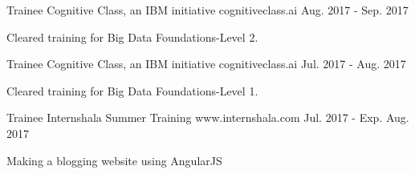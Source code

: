 


\begin{cventries}


\cventry
{Trainee} %
{Cognitive Class, an IBM initiative} %
{cognitiveclass.ai} %
{Aug. 2017 - Sep. 2017} %
{ %
\begin{cvitems}
\item {Cleared training for Big Data Foundations-Level 2.}
\end{cvitems}
}


\cventry
{Trainee} %
{Cognitive Class, an IBM initiative} %
{cognitiveclass.ai} %
{Jul. 2017 - Aug. 2017} %
{ %
\begin{cvitems}
\item {Cleared training for Big Data Foundations-Level 1.}
\end{cvitems}
}


\cventry
{Trainee} %
{Internshala Summer Training} %
{www.internshala.com} %
{Jul. 2017 - Exp. Aug. 2017} %
{ %
\begin{cvitems}
\item {Making a blogging website using AngularJS}
\end{cvitems}
}


\end{cventries}